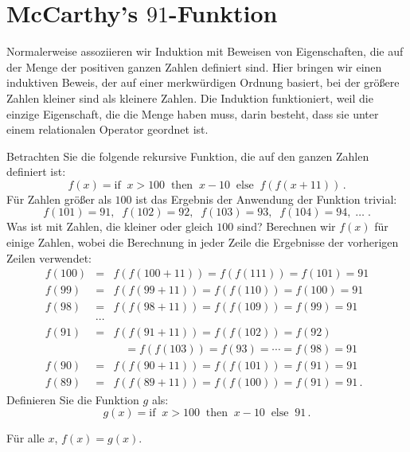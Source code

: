 \section{McCarthy's $91$-Funktion}\label{s.induction-mccarthy}


Normalerweise assoziieren wir Induktion mit Beweisen von Eigenschaften, die auf der Menge der positiven ganzen Zahlen definiert sind. Hier bringen wir einen induktiven Beweis, der auf einer merkwürdigen Ordnung basiert, bei der größere Zahlen kleiner sind als kleinere Zahlen. Die Induktion funktioniert, weil die einzige Eigenschaft, die die Menge haben muss, darin besteht, dass sie unter einem relationalen Operator geordnet ist.

Betrachten Sie die folgende rekursive Funktion, die auf den ganzen Zahlen definiert ist:
\[
f(x) = \textrm{if}\;\; x > 100 \;\;\textrm{then}\;\; x - 10 \;\;\textrm{else}\;\; f(f(x+11))\,.
\]
Für Zahlen größer als $100$ ist das Ergebnis der Anwendung der Funktion trivial:
\[
f(101) = 91, \;\; f(102) = 92,\;\; f(103) = 93,\;\; f(104) = 94,\;\ldots\;.
\]
Was ist mit Zahlen, die kleiner oder gleich $100$ sind? Berechnen wir $f(x)$ für einige Zahlen, wobei die Berechnung in jeder Zeile die Ergebnisse der vorherigen Zeilen verwendet:
\begin{eqnarray*}
f(100) &=& f(f(100+11)) = f(f(111)) = f(101) = 91\\
f(99) &=& f(f(99+11)) = f(f(110)) = f(100) = 91\\
f(98) &=& f(f(98+11)) = f(f(109)) = f(99) = 91\\
&\cdots&\\
f(91) &=& f(f(91+11)) = f(f(102)) = f(92)\\
&& \quad = f(f(103)) = f(93) = \cdots =f(98) = 91\\
f(90) &=& f(f(90+11)) = f(f(101)) = f(91) = 91\\
f(89) &=& f(f(89+11)) = f(f(100)) = f(91) = 91\,.
\end{eqnarray*}
Definieren Sie die Funktion $g$ als:
\[
g(x) = \textrm{if}\;\; x > 100 \;\;\textrm{then}\;\; x - 10 \;\;\textrm{else}\;\; 91\,.
\]

\begin{theorem}
Für alle $x$, $f(x) = g(x)$.
\end{theorem}


